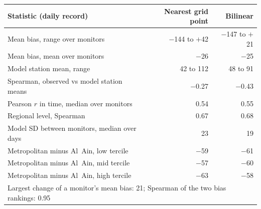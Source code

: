 \begin{tabular}{lrr}
\toprule
Statistic (daily record) & Nearest grid point & Bilinear \\
\midrule
Mean bias, range over monitors & $-$144 to $+$42 & $-$147 to $+$21 \\
Mean bias, mean over monitors & $-$26 & $-$25 \\
Model station mean, range & 42 to 112 & 48 to 91 \\
Spearman, observed vs model station means & $-$0.27 & $-$0.43 \\
Pearson $r$ in time, median over monitors & 0.54 & 0.55 \\
Regional level, Spearman & 0.67 & 0.68 \\
Model SD between monitors, median over days & 23 & 19 \\
Metropolitan minus Al~Ain, low tercile & $-$59 & $-$61 \\
Metropolitan minus Al~Ain, mid tercile & $-$57 & $-$60 \\
Metropolitan minus Al~Ain, high tercile & $-$63 & $-$58 \\
\midrule
\multicolumn{3}{l}{Largest change of a monitor's mean bias: 21; Spearman of the two bias rankings: 0.95} \\
\bottomrule
\end{tabular}
